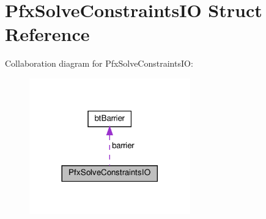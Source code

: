 \hypertarget{structPfxSolveConstraintsIO}{}\section{Pfx\+Solve\+Constraints\+IO Struct Reference}
\label{structPfxSolveConstraintsIO}


Collaboration diagram for Pfx\+Solve\+Constraints\+IO\+:
\nopagebreak
\begin{figure}[H]
\begin{center}
\leavevmode
\includegraphics[width=197pt]{structPfxSolveConstraintsIO__coll__graph}
\end{center}
\end{figure}
